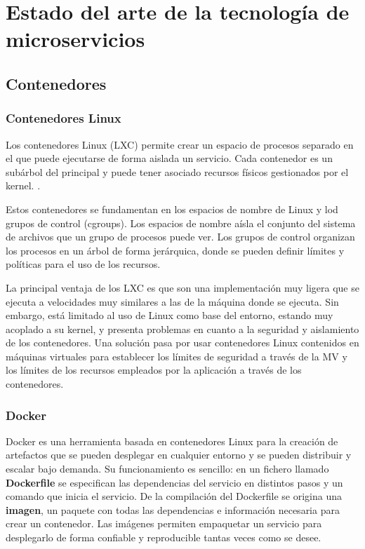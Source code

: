 \documentclass[11pt,spanish,listoffigures]{tfgetsinf}
\begin{document}
\chapter{Estado del arte de la tecnología de microservicios}

\section{Contenedores}

\subsection{Contenedores Linux}

Los contenedores Linux (LXC) permite crear un espacio de procesos separado en el que puede ejecutarse de forma aislada un servicio. Cada contenedor es un subárbol del principal y puede tener asociado recursos físicos gestionados por el kernel. \cite{Newman2015a}.

Estos contenedores se fundamentan en los espacios de nombre de Linux y lod grupos de control (cgroups). Los espacios de nombre aísla el conjunto del sistema de archivos que un grupo de procesos puede ver. Los grupos de control organizan los procesos en un árbol de forma jerárquica, donde se pueden definir límites y políticas para el uso de los recursos. \cite{Amaral2016}

La principal ventaja de los LXC es que son una implementación muy ligera que se ejecuta a velocidades muy similares a las de la máquina donde se ejecuta. Sin embargo, está limitado al uso de Linux como base del entorno, estando muy acoplado a su kernel, y presenta problemas en cuanto a la seguridad y aislamiento de los contenedores. \cite{Dua2014} Una solución pasa por usar contenedores Linux contenidos en máquinas virtuales para establecer los límites de seguridad a través de la MV y los límites de los recursos empleados por la aplicación a través de los contenedores.  \cite{DeAlfonso2017}

\subsection{Docker}

Docker es una herramienta basada en contenedores Linux para la creación de artefactos que se pueden desplegar en cualquier entorno y se pueden distribuir y escalar bajo demanda. \cite{Matthias} Su funcionamiento es sencillo: en un fichero llamado \textbf{Dockerfile} se especifican las dependencias del servicio en distintos pasos y un comando que inicia el servicio. De la compilación del Dockerfile se origina una \textbf{imagen}, un paquete con todas las dependencias e información necesaria para crear un contenedor. Las imágenes permiten empaquetar un servicio para desplegarlo de forma confiable y reproducible tantas veces como se desee. \cite{DelaTorre2018}
\end{document}
